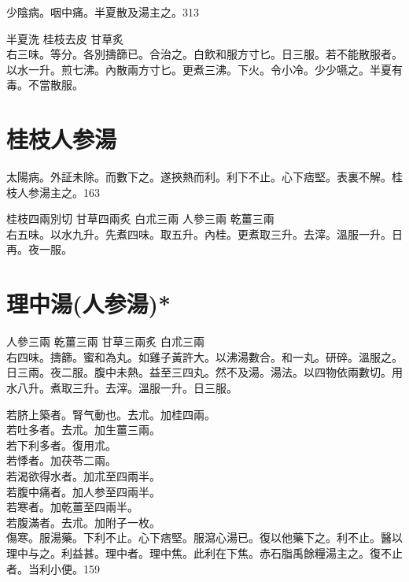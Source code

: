 \documentclass[b5paper,twoside,zihao=-4,UTF8]{ctexbook}
\begin{document}
少陰病。咽中痛。半夏散及湯主之。313

半夏{\scriptsize 洗} 桂枝{\scriptsize 去皮} 甘草{\scriptsize 炙}\\
右三味。等分。各別擣篩已。合治之。白飲和服方寸匕。日三服。若不能散服者。以水一升。煎七沸。內散兩方寸匕。更煮三沸。下火。令小冷。少少嚥之。半夏有毒。不當散服。

\section{桂枝人参湯}

太陽病。外証未除。而數下之。遂挾熱而利。利下不止。心下痞堅。表裏不解。桂枝人参湯主之。163

桂枝{\scriptsize 四兩別切} 甘草{\scriptsize 四兩炙} 白朮{\scriptsize 三兩} 人參{\scriptsize 三兩} 乾薑{\scriptsize 三兩}\\
右五味。以水九升。先煮四味。取五升。內桂。更煮取三升。去滓。溫服一升。日再。夜一服。

\section{理中湯(人参湯)*}

人參{\scriptsize 三兩} 乾薑{\scriptsize 三兩} 甘草{\scriptsize 三兩炙} 白朮{\scriptsize 三兩}\\
右四味。擣篩。蜜和為丸。如雞子黃許大。以沸湯數合。和一丸。研碎。溫服之。日三兩。夜二服。腹中未熱。益至三四丸。然不及湯。湯法。以四物依兩數切。用水八升。煮取三升。去滓。溫服一升。日三服。

{若}脐上築者。腎气動也。去朮。加桂四兩。\\
{若}吐多者。去朮。加生薑三兩。\\
{若}下{利}多者。復用朮。\\
{若}悸者。加茯苓二兩。\\
{若}渴{欲得水}者。加朮至四兩半。\\
{若}腹中痛者。加人参至四兩半。\\
{若}寒者。加乾薑至四兩半。\\
{若}腹滿者。去朮。加附子一枚。\\

傷寒。服湯藥。下利不止。心下痞堅。服瀉心湯已。復以他藥下之。利不止。醫以理中与之。利益甚。理中者。理中焦。此利在下焦。赤石脂禹餘糧湯主之。復不止者。当利小便。159
\end{document}
